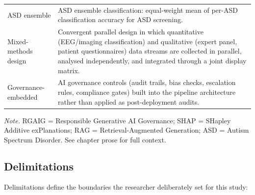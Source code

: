 {\begin{xltabular}{\textwidth}{@{} >{\raggedright\arraybackslash}p{2.8cm} L @{}}
\addlinespace
ASD ensemble & ASD ensemble classification: equal-weight mean of per-ASD classification accuracy for ASD screening. \\
\addlinespace
Mixed-methods design & Convergent parallel design in which quantitative (EEG/imaging classification) and qualitative (expert panel, patient questionnaires) data streams are collected in parallel, analysed independently, and integrated through a joint display matrix. \\
\addlinespace
Governance-embedded & AI governance controls (audit trails, bias checks, escalation rules, compliance gates) built into the pipeline architecture rather than applied as post-deployment audits. \\
\end{xltabular}}
\vspace{0.3em}\noindent\textit{Note.} RGAIG = Responsible Generative AI Governance; SHAP = SHapley Additive exPlanations; RAG = Retrieval-Augmented Generation; ASD = Autism Spectrum Disorder. See chapter prose for full context.

\subsection{Delimitations}
\label{sec:delimitations}

Delimitations define the boundaries the researcher deliberately set for this study:

